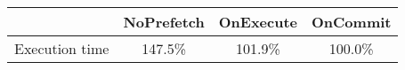 \begin{tabular}{ l|ccc }
 & NoPrefetch & OnExecute & OnCommit\\ \hline
Execution time & 147.5\% & 101.9\% & 100.0\%\\ \hline
\end{tabular}

